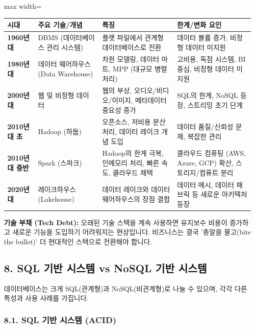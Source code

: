 \documentclass[11pt,a4paper]{article}
\theoremstyle{definition}
\begin{document}
\begin{adjustbox}{max width=\textwidth}
\begin{tabular}{llll}
\toprule
\textbf{시대} & \textbf{주요 기술/개념} & \textbf{특징} & \textbf{한계/변화 요인} \\
\midrule
\textbf{1960년대} & DBMS (데이터베이스 관리 시스템) & 플랫 파일에서 관계형 데이터베이스로 전환 & 데이터 볼륨 증가, 비정형 데이터 미지원 \\
\textbf{1980년대} & 데이터 웨어하우스 (Data Warehouse) & 차원 모델링, 데이터 마트, MPP (대규모 병렬 처리) & 고비용, 독점 시스템, BI 중심, 비정형 데이터 미지원 \\
\textbf{2000년대} & 웹 및 비정형 데이터 & 웹의 부상, 오디오/비디오/이미지, 메타데이터 중요성 증가 & SQL의 한계, NoSQL 등장, 스트리밍 초기 단계 \\
\textbf{2010년대 초} & Hadoop (하둡) & 오픈소스, 저비용 분산 처리, 데이터 레이크 개념 도입 & 데이터 품질/신뢰성 문제, 복잡한 관리 \\
\textbf{2010년대 중반} & Spark (스파크) & Hadoop의 한계 극복, 인메모리 처리, 빠른 속도, 클라우드 채택 & 클라우드 컴퓨팅 (AWS, Azure, GCP) 확산, 스토리지/컴퓨트 분리 \\
\textbf{2020년대} & 레이크하우스 (Lakehouse) & 데이터 레이크와 데이터 웨어하우스의 장점 결합 & 데이터 메시, 데이터 패브릭 등 새로운 아키텍처 등장 \\
\bottomrule
\end{tabular}
\end{adjustbox}

\begin{infobox}
\textbf{기술 부채 (Tech Debt):} 오래된 기술 스택을 계속 사용하면 유지보수 비용이 증가하고 새로운 기능을 도입하기 어려워지는 현상입니다. 비즈니스는 결국 '총알을 물고(bite the bullet)' 더 현대적인 스택으로 전환해야 합니다.
\end{infobox}

\subsection*{8. SQL 기반 시스템 vs NoSQL 기반 시스템}

데이터베이스는 크게 SQL(관계형)과 NoSQL(비관계형)로 나눌 수 있으며, 각각 다른 특성과 사용 사례를 가집니다.

\subsubsection*{8.1. SQL 기반 시스템 (ACID)}
\end{document}
